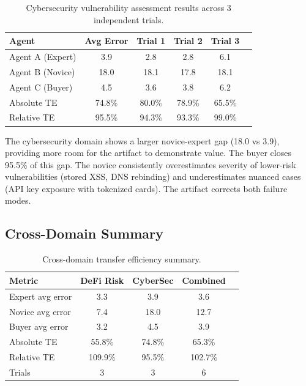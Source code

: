 \documentclass[11pt]{article}
\begin{document}
\begin{table}[h]
\centering
\caption{Cybersecurity vulnerability assessment results across 3 independent trials.}
\label{tab:cybersec_results}
\begin{tabular}{lccccc}
\toprule
\textbf{Agent} & \textbf{Avg Error} & \textbf{Trial 1} & \textbf{Trial 2} & \textbf{Trial 3} \\
\midrule
Agent A (Expert) & 3.9 & 2.8 & 2.8 & 6.1 \\
Agent B (Novice) & 18.0 & 18.1 & 17.8 & 18.1 \\
Agent C (Buyer)  & 4.5 & 3.6 & 3.8 & 6.2 \\
\midrule
Absolute TE      & 74.8\% & 80.0\% & 78.9\% & 65.5\% \\
Relative TE      & 95.5\% & 94.3\% & 93.3\% & 99.0\% \\
\bottomrule
\end{tabular}
\end{table}

The cybersecurity domain shows a larger novice-expert gap (18.0 vs 3.9), providing more room for the artifact to demonstrate value. The buyer closes 95.5\% of this gap. The novice consistently overestimates severity of lower-risk vulnerabilities (stored XSS, DNS rebinding) and underestimates nuanced cases (API key exposure with tokenized cards). The artifact corrects both failure modes.

\subsection{Cross-Domain Summary}

\begin{table}[h]
\centering
\caption{Cross-domain transfer efficiency summary.}
\label{tab:cross_domain}
\begin{tabular}{lcccc}
\toprule
\textbf{Metric} & \textbf{DeFi Risk} & \textbf{CyberSec} & \textbf{Combined} \\
\midrule
Expert avg error  & 3.3  & 3.9  & 3.6  \\
Novice avg error  & 7.4  & 18.0 & 12.7 \\
Buyer avg error   & 3.2  & 4.5  & 3.9  \\
Absolute TE       & 55.8\% & 74.8\% & 65.3\% \\
Relative TE       & 109.9\% & 95.5\% & 102.7\% \\
Trials            & 3    & 3    & 6    \\
\bottomrule
\end{tabular}
\end{table}
\end{document}
